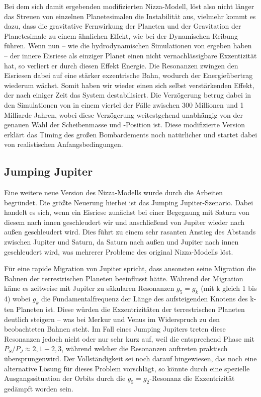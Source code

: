 \documentclass[12pt,a4paper,twoside]{article}
\begin{document}
Bei dem sich damit ergebenden modifizierten Nizza-Modell, löst also nicht länger das Streuen von einzelnen Planetesimalen die Instabilität aus, vielmehr kommt es dazu, dass die gravitative Fernwirkung der Planeten und der Gravitation der Planetesimale zu einem ähnlichen Effekt, wie bei der Dynamischen Reibung führen.
Wenn nun -- wie die hydrodynamischen Simulationen von \cite{Morbidelli2007b} ergeben haben -- der innere Eisriese als einziger Planet einen nicht vernachlässigbare Exzentizität hat, so verliert er durch diesen Effekt Energie. Die Resonanzen zwingen den Eisriesen dabei auf eine stärker exzentrische Bahn, wodurch der Energieübertrag wiederum wächst.
Somit haben wir wieder einen sich selbst verstärkenden Effekt, der nach einiger Zeit das System destabilisiert. Die Verzögerung betrug dabei in den Simulationen von \cite{Levison2011} in einem viertel der Fälle zwischen 300 Millionen und 1 Milliarde Jahren, wobei diese Verzögerung weitestgehend unabhängig von der genauen Wahl der Scheibenmasse und -Position ist.
Diese modifizierte Version erklärt das Timing des großen Bombardements noch natürlicher und startet dabei von realistischen Anfangsbedingungen.

\subsection{Jumping Jupiter}\label{jumpingjupiter}
Eine weitere neue Version des Nizza-Modells wurde durch die Arbeiten \cite{Morbidelli2009,Brasser2009,Morbidelli2010} begründet. Die größte Neuerung hierbei ist das \glqq Jumping Jupiter-Szenario\grqq.
Dabei handelt es sich, wenn ein Eisriese zunächst bei einer Begegnung mit Saturn von diesem nach innen geschleudert wir und anschließend von Jupiter wieder nach außen geschleudert wird.
Dies führt zu einem sehr rasanten Anstieg des Abstands zwischen Jupiter und Saturn, da Saturn nach außen und Jupiter nach innen geschleudert wird, was mehrerer Probleme des original Nizza-Modells löst.

Für eine rapide Migration von Jupiter spricht, dass ansonsten seine Migration die Bahnen der terrestrischen Planeten beeinflusst hätte\cite{Brasser2009}. Während der Migration käme es zeitweise mit Jupiter zu säkularen Resonanzen $g_5 = g_k$ (mit k gleich 1 bis 4) wobei $g_k$ die Fundamentalfrequenz der Länge des aufsteigenden Knotens des k-ten Planeten ist. Diese würden die Exzentrizitäten der terrestrischen Planeten deutlich steigern – was bei Merkur und Venus im Widerspruch zu den beobachteten Bahnen steht. Im Fall eines Jumping Jupiters treten diese Resonanzen jedoch nicht oder nur sehr kurz auf, weil die entsprechend Phase mit $P_S/P_J\approx2,1-2,3$, während welcher die Resonanzen auftreten praktisch \glqq übersprungen\grqq wird. %
Der Vollständigkeit sei noch darauf hingewiesen, das \cite{Brasser2009} noch eine alternative Lösung für dieses Problem vorschlägt, so könnte durch eine spezielle Ausgangssituation der Orbits durch die $g_5=g_2$-Resonanz die Exzentrizität gedämpft worden sein. %
\end{document}
